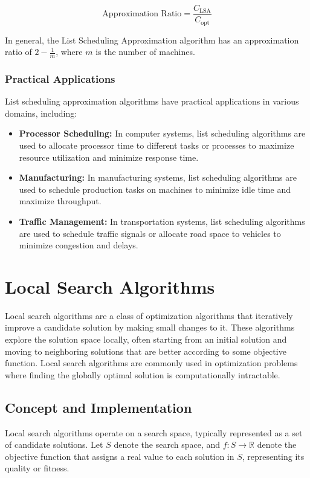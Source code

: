 \documentclass[12pt]{book} %
\begin{document}
\[
\text{Approximation Ratio} = \frac{C_{\text{LSA}}}{C_{\text{opt}}}
\]

In general, the List Scheduling Approximation algorithm has an approximation ratio of \(2 - \frac{1}{m}\), where \(m\) is the number of machines.

\subsubsection{Practical Applications}
List scheduling approximation algorithms have practical applications in various domains, including:

\begin{itemize}
    \item \textbf{Processor Scheduling:} In computer systems, list scheduling algorithms are used to allocate processor time to different tasks or processes to maximize resource utilization and minimize response time.
    \item \textbf{Manufacturing:} In manufacturing systems, list scheduling algorithms are used to schedule production tasks on machines to minimize idle time and maximize throughput.
    \item \textbf{Traffic Management:} In transportation systems, list scheduling algorithms are used to schedule traffic signals or allocate road space to vehicles to minimize congestion and delays.
\end{itemize}


\section{Local Search Algorithms}

Local search algorithms are a class of optimization algorithms that iteratively improve a candidate solution by making small changes to it. These algorithms explore the solution space locally, often starting from an initial solution and moving to neighboring solutions that are better according to some objective function. Local search algorithms are commonly used in optimization problems where finding the globally optimal solution is computationally intractable.

\subsection{Concept and Implementation}

Local search algorithms operate on a search space, typically represented as a set of candidate solutions. Let \(S\) denote the search space, and \(f : S \rightarrow \mathbb{R}\) denote the objective function that assigns a real value to each solution in \(S\), representing its quality or fitness.
\end{document}
